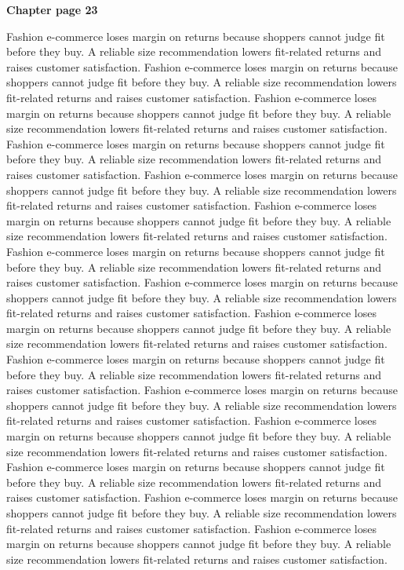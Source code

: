 \documentclass[a4paper,11pt]{article}
\begin{document}
{\headfont\bfseries\Large Chapter page 23}\par\medskip
Fashion e-commerce loses margin on returns because shoppers cannot judge fit before they buy. A reliable size recommendation lowers fit-related returns and raises customer satisfaction. Fashion e-commerce loses margin on returns because shoppers cannot judge fit before they buy. A reliable size recommendation lowers fit-related returns and raises customer satisfaction. Fashion e-commerce loses margin on returns because shoppers cannot judge fit before they buy. A reliable size recommendation lowers fit-related returns and raises customer satisfaction. Fashion e-commerce loses margin on returns because shoppers cannot judge fit before they buy. A reliable size recommendation lowers fit-related returns and raises customer satisfaction. Fashion e-commerce loses margin on returns because shoppers cannot judge fit before they buy. A reliable size recommendation lowers fit-related returns and raises customer satisfaction. 
Fashion e-commerce loses margin on returns because shoppers cannot judge fit before they buy. A reliable size recommendation lowers fit-related returns and raises customer satisfaction. Fashion e-commerce loses margin on returns because shoppers cannot judge fit before they buy. A reliable size recommendation lowers fit-related returns and raises customer satisfaction. Fashion e-commerce loses margin on returns because shoppers cannot judge fit before they buy. A reliable size recommendation lowers fit-related returns and raises customer satisfaction. Fashion e-commerce loses margin on returns because shoppers cannot judge fit before they buy. A reliable size recommendation lowers fit-related returns and raises customer satisfaction. Fashion e-commerce loses margin on returns because shoppers cannot judge fit before they buy. A reliable size recommendation lowers fit-related returns and raises customer satisfaction. 
Fashion e-commerce loses margin on returns because shoppers cannot judge fit before they buy. A reliable size recommendation lowers fit-related returns and raises customer satisfaction. Fashion e-commerce loses margin on returns because shoppers cannot judge fit before they buy. A reliable size recommendation lowers fit-related returns and raises customer satisfaction. Fashion e-commerce loses margin on returns because shoppers cannot judge fit before they buy. A reliable size recommendation lowers fit-related returns and raises customer satisfaction. Fashion e-commerce loses margin on returns because shoppers cannot judge fit before they buy. A reliable size recommendation lowers fit-related returns and raises customer satisfaction. Fashion e-commerce loses margin on returns because shoppers cannot judge fit before they buy. A reliable size recommendation lowers fit-related returns and raises customer satisfaction. \newpage
\end{document}
